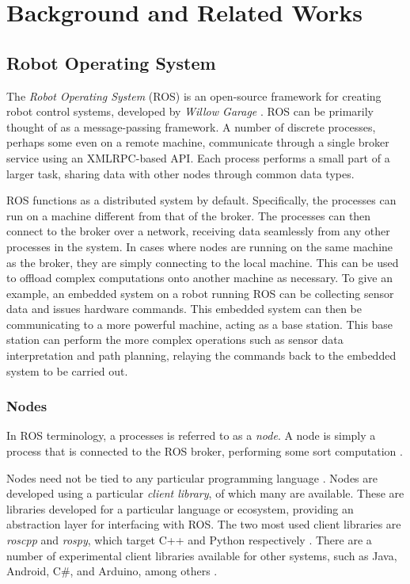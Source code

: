 \chapter{Background and Related Works}
\label{chap:background}


\section{Robot Operating System}

The \emph{Robot Operating System} (ROS) is an open-source framework for creating robot control systems, developed by \emph{Willow Garage} \cite{ros_paper}. ROS can be primarily thought of as a message-passing framework. A number of discrete processes, perhaps some even on a remote machine, communicate through a single broker service using an XMLRPC-based API. Each process performs a small part of a larger task, sharing data with other nodes through common data types.

ROS functions as a distributed system by default. Specifically, the processes can run on a machine different from that of the broker. The processes can then connect to the broker over a network, receiving data seamlessly from any other processes in the system. In cases where nodes are running on the same machine as the broker, they are simply connecting to the local machine. This can be used to offload complex computations onto another machine as necessary. To give an example, an embedded system on a robot running ROS can be collecting sensor data and issues hardware commands. This embedded system can then be communicating to a more powerful machine, acting as a base station. This base station can perform the more complex operations such as sensor data interpretation and path planning, relaying the commands back to the embedded system to be carried out.

\subsection{Nodes}
In ROS terminology, a processes is referred to as a \emph{node}. A node is simply a process that is connected to the ROS broker, performing some sort computation \cite{ros_paper}.

Nodes need not be tied to any particular programming language \cite{ros_paper}. Nodes are developed using a particular \emph{client library}, of which many are available. These are libraries developed for a particular language or ecosystem, providing an abstraction layer for interfacing with ROS. The two most used client libraries are \emph{roscpp} and \emph{rospy}, which target C++ and Python respectively \cite{ros_wiki_clientlibraries}. There are a number of experimental client libraries available for other systems, such as Java, Android, C\#, and Arduino, among others \cite{ros_wiki_clientlibraries}.

